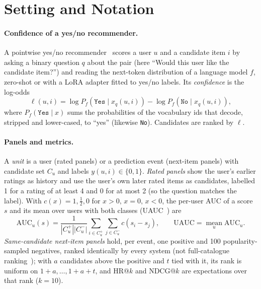 \section{Setting and Notation}
\label{sec:setting}

\paragraph{Confidence of a yes/no recommender.}
A pointwise yes/no recommender~\citep{bao2023tallrec,zhang2025collm} scores a user $u$ and a candidate item $i$ by asking a binary
question $q$ about the pair (here ``Would this user like the candidate item?'') and reading the next-token distribution of a
language model $f$, zero-shot or with a LoRA adapter fitted to yes/no labels. Its \emph{confidence} is the log-odds
\begin{equation}\label{eq:logit}
  \ell(u,i)=\log P_f(\texttt{Yes}\mid x_q(u,i))-\log P_f(\texttt{No}\mid x_q(u,i)),
\end{equation}
where $P_f(\texttt{Yes}\mid x)$ sums the probabilities of the vocabulary ids that decode, stripped and lower-cased, to ``yes''
(likewise \texttt{No}). Candidates are ranked by $\ell$.

\paragraph{Panels and metrics.}
A \emph{unit} is a user (rated panels) or a prediction event (next-item panels) with candidate set $C_u$ and labels
$y(u,i)\in\{0,1\}$. \emph{Rated panels} show the user's earlier ratings as history and use the user's own later rated items as
candidates, labelled 1 for a rating of at least 4 and 0 for at most 2 (so the question matches the label). With
$c(x)=1,\tfrac12,0$ for $x>0,\,x=0,\,x<0$, the per-user AUC of a score $s$ and its mean over users with both classes
(UAUC~\citep{zhang2025collm,zhang2024binllm}) are
\[
  \mathrm{AUC}_u(s)=\frac{1}{|C_u^+||C_u^-|}\sum_{i\in C_u^+}\sum_{j\in C_u^-}c(s_i-s_j),\qquad
  \mathrm{UAUC}=\operatorname*{mean}_{u}\mathrm{AUC}_u .
\]
\emph{Same-candidate next-item panels} hold, per event, one positive and 100 popularity-sampled negatives, ranked identically by
every system (not full-catalogue ranking~\citep{krichene2020sampled}); with $a$ candidates above the positive and $t$ tied with
it, its rank is uniform on $1{+}a,\dots,1{+}a{+}t$, and HR@$k$ and NDCG@$k$ are expectations over that rank ($k=10$).

